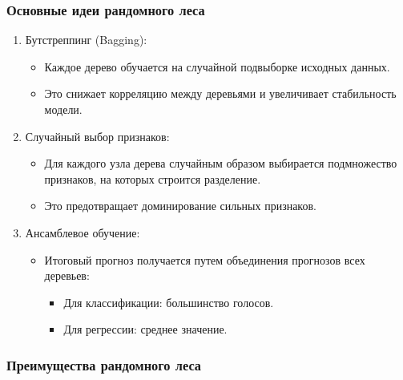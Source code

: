 \begin{enumerate}
{\subsubsection*{Основные идеи рандомного
леса}\label{ux43eux441ux43dux43eux432ux43dux44bux435-ux438ux434ux435ux438-ux440ux430ux43dux434ux43eux43cux43dux43eux433ux43e-ux43bux435ux441ux430}}

\begin{enumerate}
\def\labelenumi{\arabic{enumi}.}
\tightlist
\item
  Бутстреппинг (Bagging):

  \begin{itemize}
  \tightlist
  \item
    Каждое дерево обучается на случайной подвыборке исходных данных.
  \item
    Это снижает корреляцию между деревьями и увеличивает стабильность
    модели.
  \end{itemize}
\item
  Случайный выбор признаков:

  \begin{itemize}
  \tightlist
  \item
    Для каждого узла дерева случайным образом выбирается подмножество
    признаков, на которых строится разделение.
  \item
    Это предотвращает доминирование сильных признаков.
  \end{itemize}
\item
  Ансамблевое обучение:

  \begin{itemize}
  \tightlist
  \item
    Итоговый прогноз получается путем объединения прогнозов всех
    деревьев:

    \begin{itemize}
    \tightlist
    \item Для классификации: большинство голосов.
    \item Для регрессии: среднее значение.
    \end{itemize}
  \end{itemize}
\end{enumerate}

\hypertarget{ux43fux440ux435ux438ux43cux443ux449ux435ux441ux442ux432ux430-ux440ux430ux43dux434ux43eux43cux43dux43eux433ux43e-ux43bux435ux441ux430}{%
\subsubsection*{Преимущества рандомного
леса}\label{ux43fux440ux435ux438ux43cux443ux449ux435ux441ux442ux432ux430-ux440ux430ux43dux434ux43eux43cux43dux43eux433ux43e-ux43bux435ux441ux430}}


\end{enumerate}
